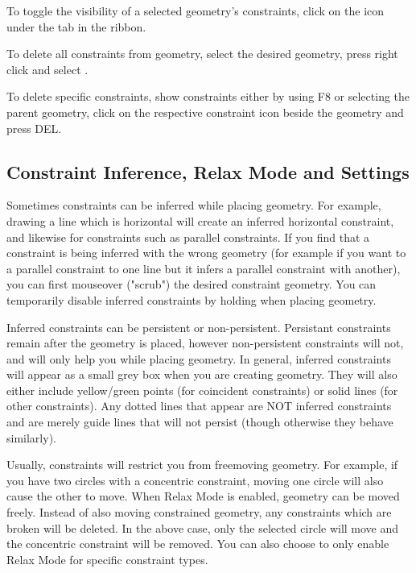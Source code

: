 To toggle the visibility of a selected geometry's constraints, click on the  icon under the  tab in the ribbon.

To delete all constraints from geometry, select the desired geometry, press right click and select .

To delete specific constraints, show constraints either by using F8 or selecting the parent geometry, click on the respective constraint icon beside the geometry and press DEL.

\subsection{Constraint Inference, Relax Mode and Settings}

Sometimes constraints can be inferred while placing geometry. For example, drawing a line which is horizontal will create an inferred horizontal constraint, and likewise for constraints such as parallel constraints. If you find that a constraint is being inferred with the wrong geometry (for example if you want to a parallel constraint to one line but it infers a parallel constraint with another), you can first mouseover ("scrub") the desired constraint geometry. You can temporarily disable inferred constraints by holding  when placing geometry.

Inferred constraints can be persistent or non-persistent. Persistant constraints remain after the geometry is placed, however non-persistent constraints will not, and will only help you while placing geometry. In general, inferred constraints will appear as a small grey box when you are creating geometry. They will also either include yellow/green points (for coincident constraints) or solid lines (for other constraints). Any dotted lines that appear are NOT inferred constraints and are merely guide lines that will not persist (though otherwise they behave similarly).

Usually, constraints will restrict you from freemoving geometry. For example, if you have two circles with a concentric constraint, moving one circle will also cause the other to move. When Relax Mode is enabled, geometry can be moved freely. Instead of also moving constrained geometry, any constraints which are broken will be deleted. In the above case, only the selected circle will move and the concentric constraint will be removed. You can also choose to only enable Relax Mode for specific constraint types.


